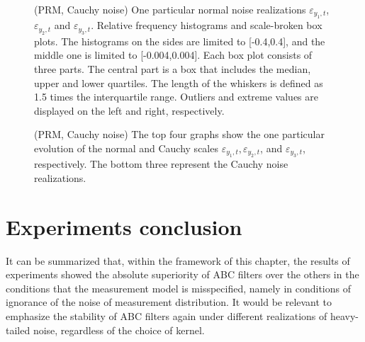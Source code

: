 \begin{figure}[!ht]
\centering
\caption{(PRM, Cauchy noise) One particular normal noise realizations \(\varepsilon_{y_1,t}\), \(\varepsilon_{y_2,t}\) and \(\varepsilon_{y_3,t}\). Relative frequency histograms and scale-broken box plots. The histograms on the sides are limited to [-0.4,0.4], and the middle one is limited to [-0.004,0.004]. Each box plot consists of three parts. The central part is a box that includes the median, upper and lower quartiles. The length of the whiskers is defined as 1.5 times the interquartile range. Outliers and extreme values are displayed on the left and right, respectively.}
\label{fig:prm_measurement_noise_cauchy}
\end{figure}

\begin{figure}[!ht]
\centering
\caption{(PRM, Cauchy noise) The top four graphs show the one particular evolution of the normal and Cauchy scales \(\varepsilon_{y_1,t}, \varepsilon_{y_2,t}\), and \(\varepsilon_{y_3,t}\), respectively. The bottom three represent the Cauchy noise realizations.}
\label{fig:prm_abc_scales_evolution_cauchy}
\end{figure}

\section{Experiments conclusion}
It can be summarized that, within the framework of this chapter, the results of experiments showed the absolute superiority of ABC filters over the others in the conditions that the measurement model is misspecified, namely in conditions of ignorance of the noise of measurement distribution. It would be relevant to emphasize the stability of ABC filters again under different realizations of heavy-tailed noise, regardless of the choice of kernel.
